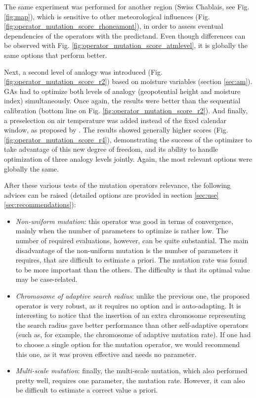 \documentclass{ametsoc}
\begin{document}
The same experiment was performed for another region (Swiss Chablais, see Fig. \ref{fig:map}), which is sensitive to other meteorological influences (Fig. \ref{fig:operator_mutation_score_rhoneamont}), in order to assess eventual dependencies of the operators with the predictand. Even though differences can be observed with Fig. \ref{fig:operator_mutation_score_atmlevel}, it is globally the same options that perform better.

Next, a second level of analogy was introduced (Fig. \ref{fig:operator_mutation_score_r2}) based on moisture variables (section \ref{sec:am}). GAs had to optimize both levels of analogy (geopotential height and moisture index) simultaneously. Once again, the results were better than the sequential calibration (bottom line on Fig. \ref{fig:operator_mutation_score_r2}). And finally, a preselection on air temperature was added instead of the fixed calendar window, as proposed by \cite{BenDaoud2016}. The results showed generally higher scores (Fig. \ref{fig:operator_mutation_score_r4}), demonstrating the success of the optimizer to take advantage of this new degree of freedom, and its ability to handle optimization of three analogy levels jointly. Again, the most relevant options were globally the same.

After these various tests of the mutation operators relevance, the following advices can be raised (detailed options are provided in section \ref{sec:use}\ref{sec:recommendations}):

\begin{itemize}
	
	\item \textit{Non-uniform mutation}: this operator was good in terms of convergence, mainly when the number of parameters to optimize is rather low. The number of required evaluations, however, can be quite substantial. The main disadvantage of the non-uniform mutation is the number of parameters it requires, that are difficult to estimate a priori. The mutation rate was found to be more important than the others. The difficulty is that its optimal value may be case-related.
	
	\item \textit{Chromosome of adaptive search radius}: unlike the previous one, the proposed operator is very robust, as it requires no option and is auto-adapting. It is interesting to notice that the insertion of an extra chromosome representing the search radius gave better performance than other self-adaptive operators (such as, for example, the chromosome of adaptive mutation rate). If one had to choose a single option for the mutation operator, we would recommend this one, as it was proven effective and needs no parameter.
	
	\item \textit{Multi-scale mutation}: finally, the multi-scale mutation, which also performed pretty well, requires one parameter, the mutation rate. However, it can also be difficult to estimate a correct value a priori.
	
\end{itemize}
\end{document}
